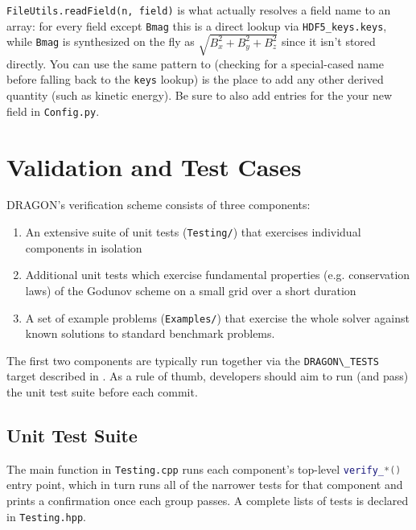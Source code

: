 \documentclass[11pt]{report}
\newcommand{\cpp}[1]{\lstinline[language=C++]{#1}}
\newcommand{\bash}[1]{\lstinline[language=bash]{#1}}
\newcommand{\py}[1]{\lstinline[language=Python]{#1}}
\begin{document}
 
 
 \py{FileUtils.readField(n, field)} is what actually resolves a field name to an array: for every field except \py{Bmag} this is a direct lookup via \py{HDF5_keys.keys}, while \py{Bmag} is synthesized on the fly as $\sqrt{B_x^2+B_y^2+B_z^2}$ since it isn't stored directly.
 You can use the same pattern to (checking for a special-cased name before falling back to the \py{keys} lookup) is the place to add any other derived quantity (such as kinetic energy). Be sure to also add entries for the your new field in \bash{Config.py}.




 



















\chapter{Validation and Test Cases}
\label{ch:tests}

DRAGON's verification scheme consists of three components:
\begin{enumerate}
\item An extensive suite of unit tests  (\bash{Testing/}) that exercises individual components in isolation
\item Additional unit tests which exercise fundamental properties (e.g. conservation laws) of the Godunov scheme on a small grid over a short duration
\item A set of example problems (\bash{Examples/}) that exercise the whole solver against known solutions to standard benchmark problems.
\end{enumerate}
The first two components are typically run together via the  \bash{DRAGON\_TESTS} target described in . As a rule of thumb, developers should aim to run (and pass) the unit test suite before each commit.

\section{Unit Test Suite}
\label{sec:tests-unit}
The main function in \bash{Testing.cpp} runs each component's top-level \cpp{verify_*()} entry point, which in turn runs all of the narrower tests for that component and prints a confirmation once each group passes. A complete lists of tests is declared in \bash{Testing.hpp}.
\end{document}
